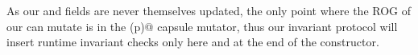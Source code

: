 As our \Q@path@ and \Q@h@ fields are never themselves updated, the only point where the ROG of our \Q@Cage@ can mutate is in the \Q@moveTo(p)@ capsule mutator, thus 
our invariant protocol will insert runtime invariant checks only here and at the end of the constructor.

\begin{comment}
We use the \Q@read@ annotation on the \Q@equals(that)@ method to express that it does not modify either its
receiver or its parameter. In \Q@Cage@ we use 
the \Q@capsule@ annotation to ensure
that the modification of the \Q@Hamster@'s ROG is fully under the control
of the containing \Q@Cage@. 
We annotated the \Q@move()@
and \Q@moveTo(p)@ methods with \Q@mut@, since they modify
their receivers' ROG. The default annotation is \Q@imm@, thus \Q@Cage@'s \Q@path@ field is a deeply immutable list of \Q@Point@s.
Our system performs runtime checks for the invariant
at the end of \Q@Cage@'s constructor, \Q@moveTo(p)@ method, and after any update to one of its fields.
The \Q@moveTo(p)@ method is the only one that may (directly) break the \Q@Cage@'s invariant. However, there is only a single occurrence of \Q@this@ and it is used to read the \Q@h@ field. We use the guarantees of RCs to ensure that no alias to \Q@this@ could be reachable from either \Q@h@ or the immutable \Q@Point@ parameter. Thus, the potentially broken \Q@this@ object is not visible while the \Q@Hamster@'s position is updated. 
The invariant is checked at the end of the \Q@moveTo(p)@ method, just before \Q@this@ would become visible again.
This technique loosely corresponds to an implicit pack and unpack: we `unpack' \Q@this@ before reading the field, then we work on the field's value while the invariant of \Q@this@ is not known to hold, finally when returning, we `pack' \Q!this! and check its invariant before allowing it to be used again.
\end{comment}

